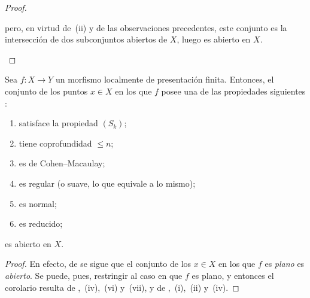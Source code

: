 \begin{proof}
\begin{enumerate}[label=(\roman*)]
pero, en virtud de~(ii) y de las observaciones precedentes, este conjunto es la intersección de dos subconjuntos abiertos de $X$, luego es abierto en $X$.
\end{enumerate}
\end{proof}

\begin{corollary}[12.1.7]
\label{IV.12.1.7}
Sea $f:X\to Y$ un morfismo localmente de presentación finita.
Entonces, el conjunto de los puntos $x\in X$ en los que $f$ posee una de las propiedades siguientes :
\begin{enumerate}[label=\textup{(\roman*)}]
  \item satisface la propiedad $(S_k)$;
  \item tiene coprofundidad $\leq n$;
  \item es de Cohen--Macaulay;
  \item es regular \textup{(o} suave\textup{, lo que equivale a lo mismo)};
  \item es normal;
  \item es reducido;
\end{enumerate}
es abierto en $X$.
\end{corollary}

\begin{proof}
En efecto, de  se sigue que el conjunto de los $x\in X$ en los que $f$ es \emph{plano} es \emph{abierto}.
Se puede, pues, restringir al caso en que $f$ es plano, y entonces el corolario resulta de ,~(iv),~(vi) y~(vii), y de ,~(i),~(ii) y~(iv).
\end{proof}

